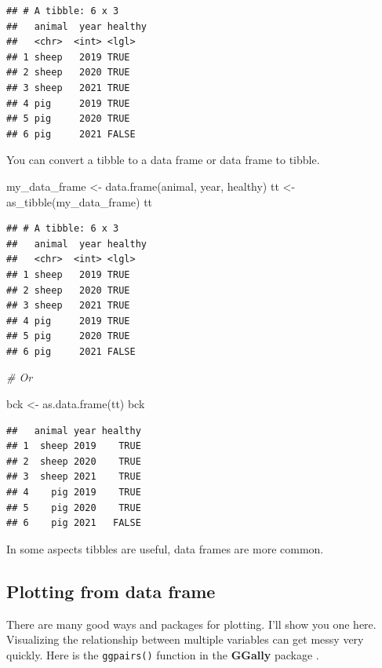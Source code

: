 \documentclass[
]{book}
\newenvironment{Shaded}{\begin{snugshade}}{\end{snugshade}}
\newcommand{\CommentTok}[1]{\textcolor[rgb]{0.56,0.35,0.01}{\textit{#1}}}
\newcommand{\FunctionTok}[1]{\textcolor[rgb]{0.00,0.00,0.00}{#1}}
\newcommand{\NormalTok}[1]{#1}
\newcommand{\OtherTok}[1]{\textcolor[rgb]{0.56,0.35,0.01}{#1}}
\begin{document}
\begin{verbatim}
## # A tibble: 6 x 3
##   animal  year healthy
##   <chr>  <int> <lgl>  
## 1 sheep   2019 TRUE   
## 2 sheep   2020 TRUE   
## 3 sheep   2021 TRUE   
## 4 pig     2019 TRUE   
## 5 pig     2020 TRUE   
## 6 pig     2021 FALSE
\end{verbatim}

You can convert a tibble to a data frame or data frame to tibble.

\begin{Shaded}
\begin{Highlighting}[]
\NormalTok{my\_data\_frame }\OtherTok{\textless{}{-}} \FunctionTok{data.frame}\NormalTok{(animal, year,  healthy)}
\NormalTok{tt }\OtherTok{\textless{}{-}} \FunctionTok{as\_tibble}\NormalTok{(my\_data\_frame)}
\NormalTok{tt}
\end{Highlighting}
\end{Shaded}

\begin{verbatim}
## # A tibble: 6 x 3
##   animal  year healthy
##   <chr>  <int> <lgl>  
## 1 sheep   2019 TRUE   
## 2 sheep   2020 TRUE   
## 3 sheep   2021 TRUE   
## 4 pig     2019 TRUE   
## 5 pig     2020 TRUE   
## 6 pig     2021 FALSE
\end{verbatim}

\begin{Shaded}
\begin{Highlighting}[]
\CommentTok{\# Or}

\NormalTok{bck }\OtherTok{\textless{}{-}} \FunctionTok{as.data.frame}\NormalTok{(tt)}
\NormalTok{bck}
\end{Highlighting}
\end{Shaded}

\begin{verbatim}
##   animal year healthy
## 1  sheep 2019    TRUE
## 2  sheep 2020    TRUE
## 3  sheep 2021    TRUE
## 4    pig 2019    TRUE
## 5    pig 2020    TRUE
## 6    pig 2021   FALSE
\end{verbatim}

In some aspects tibbles are useful, data frames are more common.

\hypertarget{plotting-from-data-frame}{%
\subsection{Plotting from data frame}\label{plotting-from-data-frame}}

There are many good ways and packages for plotting. I'll show you one here. Visualizing the relationship between multiple variables can get messy very quickly. Here is the \texttt{ggpairs()} function in the \textbf{GGally} package \citep{Tay_2019}.
\end{document}
